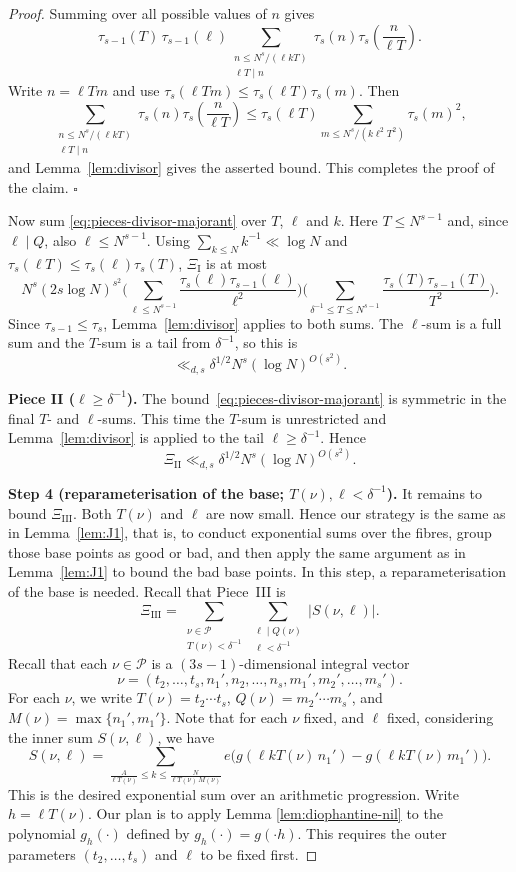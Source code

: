 \begin{proof}
Summing over all possible values of $n$ gives
\[
\tau_{s-1}(T)\,\tau_{s-1}(\ell)
\sum_{\substack{n\leq N^s/(\ell kT)\\\ell T\mid n}}
\tau_s(n)\tau_s\!\left(\frac{n}{\ell T}\right).
\]
Write \(n=\ell Tm\) and use \(\tau_s(\ell Tm)\leq\tau_s(\ell T)\tau_s(m)\).  Then
\[
\sum_{\substack{n\leq N^s/(\ell kT)\\\ell T\mid n}}
\tau_s(n)\tau_s\!\left(\frac{n}{\ell T}\right)
\leq
\tau_s(\ell T)\sum_{m\leq N^s/(k\ell^2 T^2)}\tau_s(m)^2,
\]
and Lemma~\ref{lem:divisor} gives the asserted bound.
This completes the proof of the claim.
\hfill\(\square\)

\smallskip
Now sum \eqref{eq:pieces-divisor-majorant} over $T$, $\ell$ and $k$.
Here $T\leq N^{s-1}$ and, since $\ell\mid Q$, also $\ell\leq N^{s-1}$.
Using $\sum_{k\leq N}k^{-1}\ll\log N$ and
$\tau_s(\ell T)\leq\tau_s(\ell)\tau_s(T)$, $\Xi_{\mathrm I}$ is at most
\[
N^s(2s\log N)^{s^2}
\Biggl(
\sum_{\ell\leq N^{s-1}}
\frac{\tau_s(\ell)\tau_{s-1}(\ell)}{\ell^2}
\Biggr)
\Biggl(
\sum_{\delta^{-1}\leq T\leq N^{s-1}}
\frac{\tau_s(T)\tau_{s-1}(T)}{T^2}
\Biggr).
\]
Since $\tau_{s-1}\leq\tau_s$, Lemma~\ref{lem:divisor} applies to both sums.
The $\ell$-sum is a full sum and the $T$-sum is a tail from $\delta^{-1}$, so this is
\[
\ll_{d,s}\delta^{1/2} N^s(\log N)^{O(s^2)}.
\]

\smallskip\noindent\textbf{Piece II ($\ell\geq\delta^{-1}$).}
The bound~\eqref{eq:pieces-divisor-majorant} is symmetric in the final $T$- and $\ell$-sums.
This time the $T$-sum is unrestricted and Lemma~\ref{lem:divisor} is
applied to the tail $\ell\geq\delta^{-1}$.  Hence
\[
\Xi_{\mathrm{II}}
\ll_{d,s}\delta^{1/2} N^s(\log N)^{O(s^2)}.
\]

\smallskip\noindent\textbf{Step 4 (reparameterisation of the base; $T(\nu),\ell<\delta^{-1}$).}
It remains to bound $\Xi_{\mathrm{III}}$.
Both $T(\nu)$ and $\ell$ are now small. Hence our strategy is the same as in Lemma~\ref{lem:J1}, that is, to conduct exponential sums over the fibres,
group those base points as good or bad, and then apply the same argument as in Lemma~\ref{lem:J1} to bound the bad base points. In this step, a reparameterisation of the base is needed.
Recall that Piece~III is
\[
\Xi_{\mathrm{III}}
=\sum_{\substack{\nu\in\mathscr P\\ T(\nu)<\delta^{-1}}}
\sum_{\substack{\ell\mid Q(\nu)\\ \ell<\delta^{-1}}}
\bigl|S(\nu,\ell)\bigr|.
\]
Recall that each $\nu\in\mathscr P$ is a $(3s-1)$-dimensional integral vector
\[
\nu=(t_2,\ldots,t_s,n_1',n_2,\ldots,n_s,m_1',m_2',\ldots,m_s').
\]
For each $\nu$, we write $T(\nu)=t_2\cdots t_s$, $Q(\nu)=m_2'\cdots m_s'$, and $M(\nu)=\max\{n_1',m_1'\}$.
Note that for each $\nu$ fixed, and $\ell$ fixed, considering the inner sum $S(\nu,\ell)$, we have
\[
S(\nu,\ell)
=\sum_{\tfrac{A}{\ell T(\nu)}\leq k\leq\tfrac{N}{\ell T(\nu)\,M(\nu)}}
e\bigl(g(\ell k T(\nu)\,n_1')-g(\ell k T(\nu)\,m_1')\bigr).
\]
This is the desired exponential sum over an arithmetic progression.
Write \(h=\ell T(\nu)\). 
Our plan is to apply Lemma \ref{lem:diophantine-nil} to the polynomial $g_h(\cdot)$ defined by $g_h(\cdot)=g(\cdot h)$.
This requires the outer parameters $(t_2,\ldots,t_s)$ and $\ell$ to be fixed first.



\end{proof}

